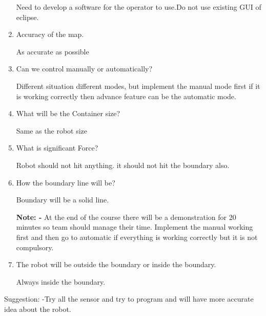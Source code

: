 \documentclass[11pt]{article}
\begin{document}
\begin{enumerate}
Need to develop a software for the operator to use.Do not use existing GUI of eclipse.

\item Accuracy of the map.



As accurate as possible 



\item Can we control manually or automatically?



Different situation different modes, but implement the manual mode first if it is working correctly then advance feature can be the automatic mode.

\item What will be the Container size? 



Same as the robot size

\item What is significant Force?



Robot should not hit anything. it should not hit the boundary also.

\item How the boundary line will be?

  

  Boundary will be a solid line.

\begin{flushleft}

 \textbf{Note: -} At the end of the course there will be a demonstration for 20 minutes so team should manage their time. Implement the manual working first and then go to automatic if     everything is working correctly but it is not compulsory.

\end{flushleft}

 

\item	The robot will be outside the boundary or inside the boundary.



Always inside the boundary.



\end{enumerate}

 \begin{flushleft}   

Suggestion: -Try all the sensor and try to program and will have more accurate idea about the robot.

\end{flushleft}    
\end{document}
